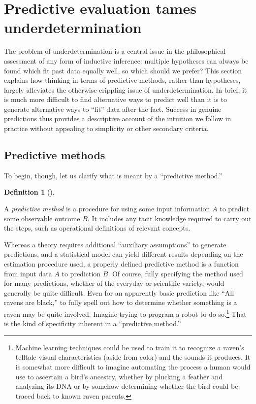 \documentclass[
  letterpaper,
  DIV=11,
  numbers=noendperiod]{scrartcl}
\theoremstyle{definition}
\newtheorem{definition}{Definition}[section]
\theoremstyle{remark}
\begin{document}
\section{Predictive evaluation tames
underdetermination}\label{sec-under}

The problem of underdetermination is a central issue in the
philosophical assessment of any form of inductive inference: multiple
hypotheses can always be found which fit past data equally well, so
which should we prefer? This section explains how thinking in terms of
predictive methods, rather than hypotheses, largely alleviates the
otherwise crippling issue of underdetermination. In brief, it is much
more difficult to find alternative ways to predict well than it is to
generate alternative ways to ``fit'' data after the fact. Success in
genuine predictions thus provides a descriptive account of the intuition
we follow in practice without appealing to simplicity or other secondary
criteria.

\subsection{Predictive methods}\label{predictive-methods}

To begin, though, let us clarify what is meant by a ``predictive
method.''

\begin{definition}[]\protect\hypertarget{def-predictive}{}\label{def-predictive}

A \emph{predictive method} is a procedure for using some input
information \(A\) to predict some observable outcome \(B\). It includes
any tacit knowledge required to carry out the steps, such as operational
definitions of relevant concepts.

\end{definition}

Whereas a theory requires additional ``auxiliary assumptions'' to
generate predictions, and a statistical model can yield different
results depending on the estimation procedure used, a properly defined
predictive method is a function from input data \(A\) to prediction
\(B\). Of course, fully specifying the method used for many predictions,
whether of the everyday or scientific variety, would generally be quite
difficult. Even for an apparently basic prediction like ``All ravens are
black,'' to fully spell out how to determine whether something is a
raven may be quite involved. Imagine trying to program a robot to do
so.\footnote{Machine learning techniques could be used to train it to
  recognize a raven's telltale visual characteristics (aside from color)
  and the sounds it produces. It is somewhat more difficult to imagine
  automating the process a human would use to ascertain a bird's
  ancestry, whether by plucking a feather and analyzing its DNA or by
  somehow determining whether the bird could be traced back to known
  raven parents.} That is the kind of specificity inherent in a
``predictive method.''
\end{document}
